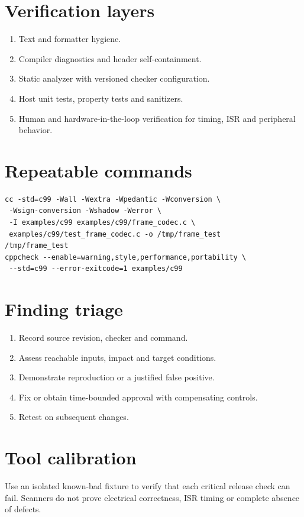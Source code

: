 \documentclass[10pt,letterpaper]{article}
\begin{document}
\makedoctitle
\makedocsummary
\section{Verification layers}
\begin{enumerate}
\item Text and formatter hygiene.
\item Compiler diagnostics and header self-containment.
\item Static analyzer with versioned checker configuration.
\item Host unit tests, property tests and sanitizers.
\item Human and hardware-in-the-loop verification for timing, ISR and peripheral behavior.
\end{enumerate}

\section{Repeatable commands}
\begin{verbatim}
cc -std=c99 -Wall -Wextra -Wpedantic -Wconversion \
 -Wsign-conversion -Wshadow -Werror \
 -I examples/c99 examples/c99/frame_codec.c \
 examples/c99/test_frame_codec.c -o /tmp/frame_test
/tmp/frame_test
cppcheck --enable=warning,style,performance,portability \
 --std=c99 --error-exitcode=1 examples/c99
\end{verbatim}
\section{Finding triage}
\begin{enumerate}
\item Record source revision, checker and command.
\item Assess reachable inputs, impact and target conditions.
\item Demonstrate reproduction or a justified false positive.
\item Fix or obtain time-bounded approval with compensating controls.
\item Retest on subsequent changes.
\end{enumerate}

\section{Tool calibration}
Use an isolated known-bad fixture to verify that each critical release check can fail. Scanners do not prove electrical correctness, ISR timing or complete absence of defects.
\end{document}
